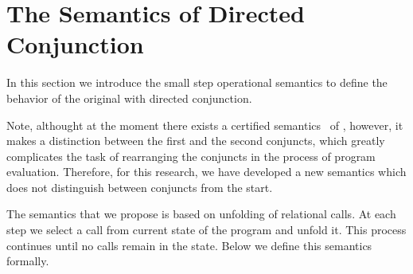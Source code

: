 \section{The Semantics of Directed Conjunction}
In this section we introduce the small step operational semantics to define the behavior of the original \mk with directed conjunction. 


Note, althought at the moment there exists a certified semantics~\cite{fair:semantics} of \mk, however, it makes a distinction between the first
and the second conjuncts, which greatly complicates the task of rearranging the conjuncts in the process of program evaluation. 
Therefore, for this research, we have developed a new semantics which does not distinguish between conjuncts from the start.


The semantics that we propose is based on unfolding of relational calls. At each step we select a call from current state of the program and unfold it.
This process continues until no calls remain in the state. Below we define this semantics formally.


